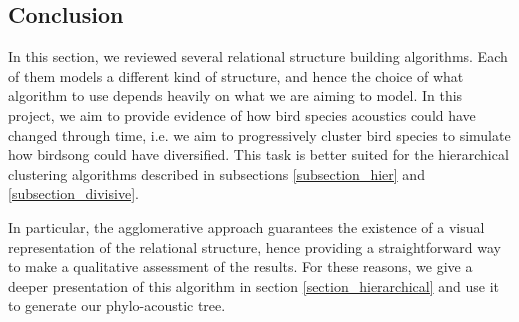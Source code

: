 \documentclass[../main.tex]{subfiles} \label{chapter_soa}
\begin{document}
\subsection{Conclusion}
In this section, we reviewed several relational structure building algorithms. Each of them models a different kind of structure, and hence the choice of what algorithm to use depends heavily on what we are aiming to model. In this project, we aim to provide evidence of how bird species acoustics could have changed through time, i.e. we aim to progressively cluster bird species to simulate how birdsong could have diversified. This task is better suited for the hierarchical clustering algorithms described in subsections \ref{subsection_hier} and \ref{subsection_divisive}. 
\par In particular, the agglomerative approach guarantees the existence of a visual representation of the relational structure, hence providing a straightforward way to make a qualitative assessment of the results. For these reasons, we give a deeper presentation of this algorithm in section \ref{section_hierarchical} and use it to generate our phylo-acoustic tree.
\end{document}
